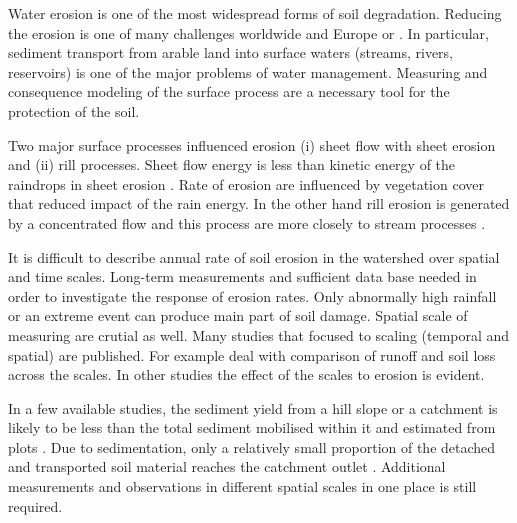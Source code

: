Water erosion is one of the most widespread forms of soil degradation. Reducing the erosion is one of many challenges worldwide and Europe \citep{LieveVan-Camp2004} or \citep{Boardman2006}. In particular, sediment transport from arable land into surface waters (streams, rivers, reservoirs) is one of the major problems of water management. Measuring and consequence modeling of the surface process are a necessary tool for the protection of the soil.

Two major surface processes influenced erosion (i) sheet flow with sheet erosion  and (ii) rill processes. Sheet flow energy is less than kinetic energy of the raindrops in sheet erosion \citep{Bryan2000}. Rate of erosion are influenced by vegetation cover that reduced impact of the rain energy. In the other hand rill erosion is generated by a concentrated flow and this process are more closely to stream processes  \cite{Gimenez2008, Govers2007}.

It is difficult to describe annual rate of soil erosion in the watershed over spatial and time scales. Long-term measurements and sufficient data base needed in order to investigate the response of erosion rates. Only abnormally high rainfall or an extreme event can produce main part of soil damage. Spatial scale of measuring are crutial as well. Many studies that focused to scaling (temporal and spatial) are published. For example \cite{Chaplot2012} deal with comparison of runoff and soil loss across the scales. In other studies \cite{Cerdan2002, Auerswald2009, BauerSGEM} the effect of the scales to erosion is evident.  

In a few available studies, the sediment yield from a hill slope or a catchment is likely to be less than the total sediment mobilised within it and estimated from plots  \cite{Walling1983}. Due to sedimentation, only a relatively small proportion of the detached and transported soil material reaches  the catchment outlet \cite{Beven2005, Verstraeten2001}.  Additional measurements and observations in different spatial scales in one place is  still required.
